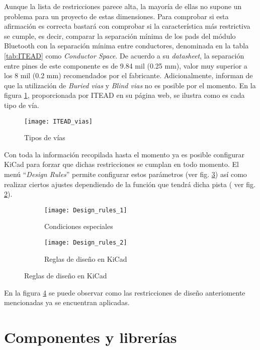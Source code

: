 Aunque la lista de restricciones parece alta, la mayoría de ellas no supone un problema para un proyecto de estas dimensiones. Para comprobar si esta afirmación es correcta bastará con comprobar si la característica más restrictiva se cumple, es decir, comparar la separación mínima de los pads del módulo Bluetooth con la separación mínima entre conductores, denominada en la tabla \ref{tab:ITEAD} como \textit{Conductor Space}. De acuerdo a su \textit{datasheet}, la separación entre pines de este componente es de 9.84 mil (0.25 mm), valor muy superior a los 8 mil (0.2 mm) recomendados por el fabricante.
\clearpage
Adicionalmente, informan de que la utilización de \textit{Buried vias} y \textit{Blind vias} no es posible por el momento. En la figura \ref{fig:ITEAD_vias}, proporcionada por ITEAD en su página web, se ilustra como es cada tipo de vía.

\begin{figure} [h]
    \centering
    \texttt{[image: ITEAD\_vias]}
    \caption{Tipos de vías}
    \label{fig:ITEAD_vias}
\end{figure}

Con toda la información recopilada hasta el momento ya es posible configurar KiCad para forzar que dichas restricciones se cumplan en todo momento. El menú ``\textit{Design Rules}'' permite configurar estos parámetros (ver fig. \ref{fig:Design_rules_general}) así como realizar ciertos ajustes dependiendo de la función que tendrá dicha pista ( ver fig. \ref{fig:Design_rules_especial}).

\begin{figure}[h]
  \begin{subfigure}[b]{8cm}
   	\centering
    \texttt{[image: Design\_rules\_1]}
    \caption{Condiciones especiales}
    \label{fig:Design_rules_especial}
  \end{subfigure}
  \hfill
  \begin{subfigure}[b]{8cm}
  	\centering
    \texttt{[image: Design\_rules\_2]}
    \caption{Reglas de diseño en KiCad}
    \label{fig:Design_rules_general}
  \end{subfigure}
  \caption{Reglas de diseño en KiCad}
  \label{fig:Design_rules}
\end{figure}

 En la figura \ref{fig:Design_rules} se puede observar como las restricciones de diseño anteriomente mencionadas ya se encuentran aplicadas.

\clearpage

\section{Componentes y librerías\label{sec:Componentes_y_librerias}}

